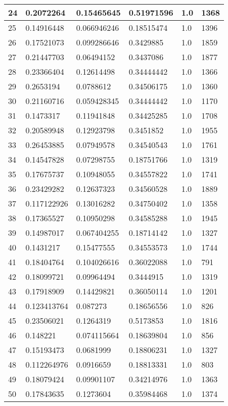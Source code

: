 \begin{longtable}{|l|l|l|l|l|l|}
24 & 0.2072264 & 0.15465645 & 0.51971596 & 1.0 & 1368 \\ \hline 
25 & 0.14916448 & 0.066946246 & 0.18515474 & 1.0 & 1396 \\ \hline 
26 & 0.17521073 & 0.099286646 & 0.3429885 & 1.0 & 1859 \\ \hline 
27 & 0.21447703 & 0.06494152 & 0.3437086 & 1.0 & 1877 \\ \hline 
28 & 0.23366404 & 0.12614498 & 0.34444442 & 1.0 & 1366 \\ \hline 
29 & 0.2653194 & 0.0788612 & 0.34506175 & 1.0 & 1360 \\ \hline 
30 & 0.21160716 & 0.059428345 & 0.34444442 & 1.0 & 1170 \\ \hline 
31 & 0.1473317 & 0.11941848 & 0.34425285 & 1.0 & 1708 \\ \hline 
32 & 0.20589948 & 0.12923798 & 0.3451852 & 1.0 & 1955 \\ \hline 
33 & 0.26453885 & 0.07949578 & 0.34540543 & 1.0 & 1761 \\ \hline 
34 & 0.14547828 & 0.07298755 & 0.18751766 & 1.0 & 1319 \\ \hline 
35 & 0.17675737 & 0.10948055 & 0.34557822 & 1.0 & 1741 \\ \hline 
36 & 0.23429282 & 0.12637323 & 0.34560528 & 1.0 & 1889 \\ \hline 
37 & 0.117122926 & 0.13016282 & 0.34750402 & 1.0 & 1358 \\ \hline 
38 & 0.17365527 & 0.10950298 & 0.34585288 & 1.0 & 1945 \\ \hline 
39 & 0.14987017 & 0.067404255 & 0.18714142 & 1.0 & 1327 \\ \hline 
40 & 0.1431217 & 0.15477555 & 0.34553573 & 1.0 & 1744 \\ \hline 
41 & 0.18404764 & 0.104026616 & 0.36022088 & 1.0 & 791 \\ \hline 
42 & 0.18099721 & 0.09964494 & 0.3444915 & 1.0 & 1319 \\ \hline 
43 & 0.17918909 & 0.14429821 & 0.36050114 & 1.0 & 1201 \\ \hline 
44 & 0.123413764 & 0.087273 & 0.18656556 & 1.0 & 826 \\ \hline 
45 & 0.23506021 & 0.1264319 & 0.5173853 & 1.0 & 1816 \\ \hline 
46 & 0.148221 & 0.074115664 & 0.18639804 & 1.0 & 856 \\ \hline 
47 & 0.15193473 & 0.0681999 & 0.18806231 & 1.0 & 1327 \\ \hline 
48 & 0.112264976 & 0.0916659 & 0.18813331 & 1.0 & 803 \\ \hline 
49 & 0.18079424 & 0.09901107 & 0.34214976 & 1.0 & 1363 \\ \hline 
50 & 0.17843635 & 0.1273604 & 0.35984468 & 1.0 & 1374 \\ \hline 
\end{longtable}